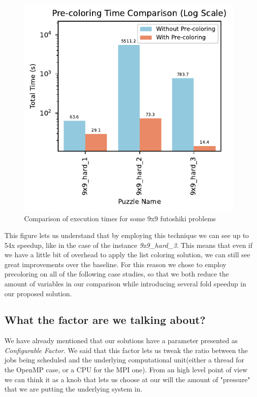 \begin{figure}[htbp]
\centering
\includegraphics[width=0.9\linewidth]{imgs/precoloring_comparison.pdf}
\caption{Comparison of execution times for some 9x9 futoshiki problems}
\label{fig:precoloring_improvement}
\end{figure}


This figure lets us understand that by employing this technique we can see up to 54x speedup, like in the case of the instance \textit{9x9\_hard\_3}. This means that even if we have a little bit of overhead to apply the list coloring solution, we can still see great improvements over the baseline. For this reason we chose to employ precoloring on all of the following case studies, so that we both reduce the amount of variables in our comparison while introducing several fold speedup in our proposed solution.

\subsection{What the factor are we talking about?}
\label{subsec:factor}
We have already mentioned that our solutions have a parameter presented as \textit{Configurable Factor}. We said that this factor lets us tweak the ratio between the jobs being scheduled and the underlying computational unit(either a thread for the OpenMP case, or a CPU for the MPI one). From an high level point of view we can think it as a knob that lets us choose at our will the amount of "pressure" that we are putting the underlying system in.

